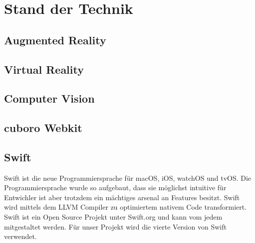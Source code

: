 \section{Stand der Technik}

\subsection{Augmented Reality}
\subsection{Virtual Reality}
\subsection{Computer Vision}

\subsection{cuboro Webkit}

\subsection{Swift}
Swift ist die neue Programmiersprache für macOS, iOS, watchOS und tvOS. Die Programmiersprache wurde so aufgebaut, dass sie möglichst intuitive für Entwichler ist aber trotzdem ein mächtiges arsenal an Features besitzt. Swift wird mittels dem LLVM Compiler zu optimiertem nativem Code transformiert. Swift ist ein Open Source Projekt unter Swift.org und kann vom jedem mitgestaltet werden. Für unser Projekt wird die vierte Version von Swift verwendet.
